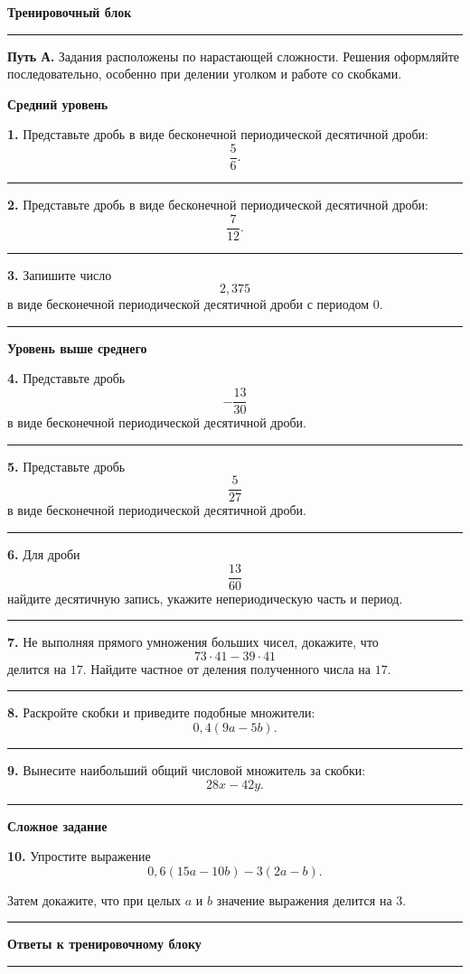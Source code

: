 \documentclass[a4paper,12pt]{article}
\newcommand{\sectiontitle}[1]{%
    \vspace{0.8em}
    {\Large\bfseries\textcolor{darkaccent}{#1}}\par
    \vspace{0.25em}
    \textcolor{accent}{\rule{\linewidth}{0.7pt}}
    \vspace{0.5em}
}
\newcommand{\subsectiontitle}[1]{%
    \vspace{0.6em}
    {\large\bfseries\textcolor{accent}{#1}}\par
    \vspace{0.2em}
}
\newcommand{\answerline}{%
    \par\vspace{0.4em}
    \textcolor{lightgray}{\rule{\linewidth}{0.6pt}}
    \vspace{0.2em}
}
\begin{document}
\clearpage
\sectiontitle{Тренировочный блок}

\textbf{Путь А.}
Задания расположены по нарастающей сложности.
Решения оформляйте последовательно, особенно при делении уголком
и работе со скобками.

\subsectiontitle{Средний уровень}

\textbf{1.}
Представьте дробь в виде бесконечной периодической десятичной дроби:
\[
\frac56.
\]
\answerline

\textbf{2.}
Представьте дробь в виде бесконечной периодической десятичной дроби:
\[
\frac7{12}.
\]
\answerline

\textbf{3.}
Запишите число
\[
2,375
\]
в виде бесконечной периодической десятичной дроби с периодом \(0\).
\answerline

\subsectiontitle{Уровень выше среднего}

\textbf{4.}
Представьте дробь
\[
-\frac{13}{30}
\]
в виде бесконечной периодической десятичной дроби.
\answerline

\textbf{5.}
Представьте дробь
\[
\frac5{27}
\]
в виде бесконечной периодической десятичной дроби.
\answerline

\textbf{6.}
Для дроби
\[
\frac{13}{60}
\]
найдите десятичную запись, укажите непериодическую часть и период.
\answerline

\textbf{7.}
Не выполняя прямого умножения больших чисел, докажите, что
\[
73\cdot41-39\cdot41
\]
делится на \(17\). Найдите частное от деления полученного числа на \(17\).
\answerline

\textbf{8.}
Раскройте скобки и приведите подобные множители:
\[
0,4(9a-5b).
\]
\answerline

\textbf{9.}
Вынесите наибольший общий числовой множитель за скобки:
\[
28x-42y.
\]
\answerline

\subsectiontitle{Сложное задание}

\textbf{10.}
Упростите выражение
\[
0,6(15a-10b)-3(2a-b).
\]

Затем докажите, что при целых \(a\) и \(b\) значение выражения
делится на \(3\).
\answerline

\clearpage
\sectiontitle{Ответы к тренировочному блоку}

\renewcommand{\arraystretch}{1.45}
\end{document}
